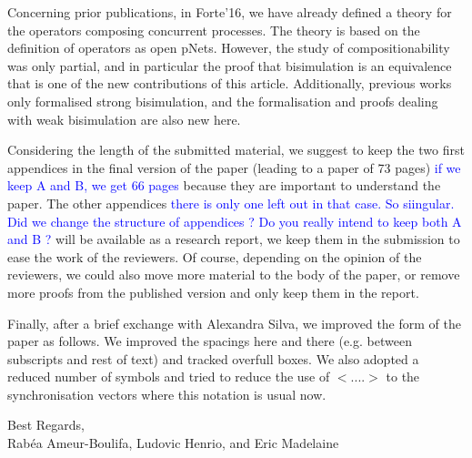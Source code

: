 \documentclass[10pt]{article}
\newcommand{\Eric}[1]{\textcolor{blue}{#1}}
\begin{document}
Concerning prior publications, in Forte'16, we have already defined a theory for the operators composing concurrent processes. The theory is based on the definition of operators as open pNets. However, the study of compositionability was only partial, and in particular the proof that bisimulation is an equivalence that is one of the new contributions of this article. Additionally, previous works only formalised strong bisimulation, and the formalisation and proofs dealing with weak bisimulation are also new here.




\smallskip

Considering the length of the submitted material,
 we   suggest to
keep the two first appendices in the final version of the paper (leading to a
paper of 73 pages) \Eric{if we keep A and B, we get 66 pages} because they are important to understand the paper.
The other appendices \Eric{there is only one left out in that case. So siingular. Did we change the structure of appendices ? Do you really intend to keep both A and B ?} will be available as a research report, we keep
them in the submission to ease the work of the reviewers. 
Of course, depending on the opinion of the reviewers, we could also move more material to  the body of the paper, or remove more proofs from the published version and only keep them in the report.


\smallskip

Finally, after a brief exchange with Alexandra Silva, we improved the form of the paper as follows. We improved the spacings here and there (e.g. between subscripts and rest of text) and tracked overfull boxes. We also adopted a reduced number of symbols and tried to reduce the use of $<....>$ to the synchronisation vectors where this notation is usual now.

\begin{flushright}
  Best Regards,\\
  Rab\'ea Ameur-Boulifa, Ludovic Henrio, and Eric Madelaine
\end{flushright}
\end{document}
